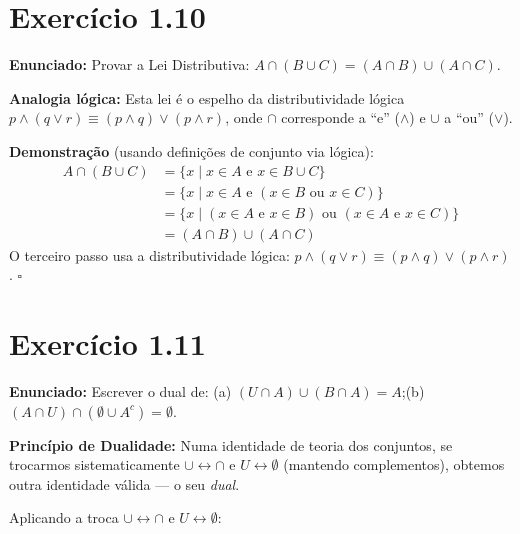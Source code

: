 \documentclass[12pt,a4paper]{article}
\begin{document}
\section*{Exercício 1.10}

\textbf{Enunciado:} Provar a Lei Distributiva: $A \cap (B \cup C) = (A \cap B) \cup (A \cap C)$.

\begin{teoribox}
\textbf{Analogia lógica:} Esta lei é o espelho da distributividade lógica $p \land (q \lor r) \equiv (p \land q) \lor (p \land r)$, onde $\cap$ corresponde a ``e'' ($\land$) e $\cup$ a ``ou'' ($\lor$).
\end{teoribox}

\textbf{Demonstração} (usando definições de conjunto via lógica):
\begin{align*}
A \cap (B \cup C) &= \{x \mid x \in A \text{ e } x \in B \cup C\} \\
&= \{x \mid x \in A \text{ e } (x \in B \text{ ou } x \in C)\} \\
&= \{x \mid (x \in A \text{ e } x \in B) \text{ ou } (x \in A \text{ e } x \in C)\} \\
&= (A \cap B) \cup (A \cap C)
\end{align*}
O terceiro passo usa a distributividade lógica: $p \land (q \lor r) \equiv (p \land q) \lor (p \land r)$. \hfill$\square$

\section*{Exercício 1.11}

\textbf{Enunciado:} Escrever o dual de: (a) $(U \cap A) \cup (B \cap A) = A$;\quad (b) $(A \cap U) \cap (\emptyset \cup A^c) = \emptyset$.

\begin{teoribox}
\textbf{Princípio de Dualidade:} Numa identidade de teoria dos conjuntos, se trocarmos sistematicamente $\cup \leftrightarrow \cap$ e $U \leftrightarrow \emptyset$ (mantendo complementos), obtemos outra identidade válida --- o seu \emph{dual}.
\end{teoribox}

Aplicando a troca $\cup \leftrightarrow \cap$ e $U \leftrightarrow \emptyset$:
\end{document}

